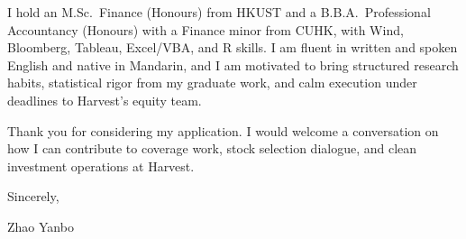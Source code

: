 \documentclass[10pt,a4paper]{article}
\begin{document}
I hold an M.Sc.\ Finance (Honours) from HKUST and a B.B.A.\ Professional Accountancy (Honours) with a Finance minor from CUHK, with Wind, Bloomberg, Tableau, Excel/VBA, and R skills. I am fluent in written and spoken English and native in Mandarin, and I am motivated to bring structured research habits, statistical rigor from my graduate work, and calm execution under deadlines to Harvest’s equity team.

Thank you for considering my application. I would welcome a conversation on how I can contribute to coverage work, stock selection dialogue, and clean investment operations at Harvest.

\vspace{1em}

Sincerely,

\vspace{2em}

Zhao Yanbo
\end{document}
